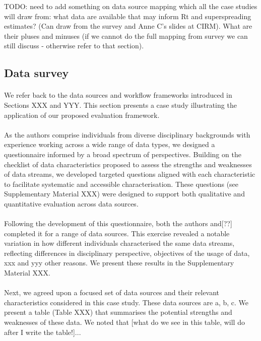 \documentclass{article}
\begin{document}
TODO: need to add something on data source mapping which all the case studies will draw from: what data are available that may inform Rt and superspreading estimates? (Can draw from the survey and Anne C's slides at CIRM). What are their pluses and minuses (if we cannot do the full mapping from survey we can still discuss - otherwise refer to that section).

\subsection{Data survey}

\paragraph{}We refer back to the data sources and workflow frameworks introduced in Sections XXX and YYY. This section presents a case study illustrating the application of our proposed evaluation framework. 

\paragraph{}As the authors comprise individuals from diverse disciplinary backgrounds with experience working across a wide range of data types, we designed a questionnaire informed by a broad spectrum of perspectives. Building on the checklist of data characteristics proposed to assess the strengths and weaknesses of data streams, we developed targeted questions aligned with each characteristic to facilitate systematic and accessible characterisation. These questions (see Supplementary Material XXX) were designed to support both qualitative and quantitative evaluation across data sources. 

\paragraph{}Following the development of this questionnaire, both the authors and[??] completed it for a range of data sources. This exercise revealed a notable variation in how different individuals characterised the same data streams, reflecting differences in disciplinary perspective, objectives of the usage of data, xxx and yyy other reasons. We present these results in the Supplementary Material XXX. 

\paragraph{}Next, we agreed upon a focused set of data sources and their relevant characteristics considered in this case study. These data sources are a, b, c. We present a table (Table XXX) that summarises the potential strengths and weaknesses of these data. We noted that [what do we see in this table, will do after I write the table!]... 
\end{document}
